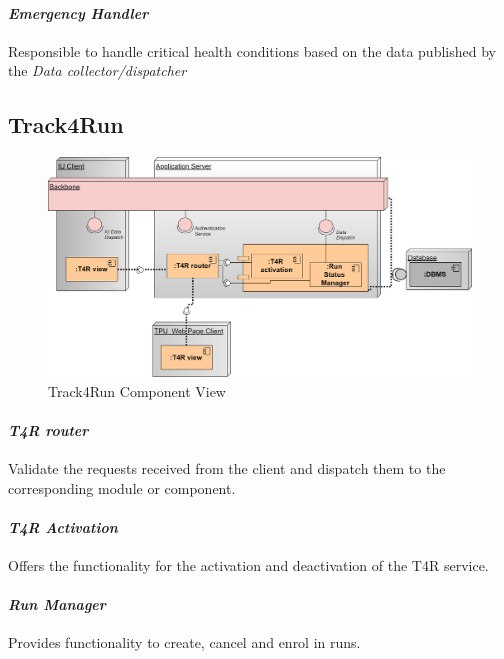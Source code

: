 \paragraph{\textit{Emergency Handler}} Responsible to handle critical health conditions based on the data published by the \textit{Data collector/dispatcher}
\subsection{Track4Run}
\label{subsect:T4RComponentView}
\begin{figure}[H]
\caption{Track4Run Component View}
\centering
\includegraphics[width = \textwidth]{sections/architecturalDesign/T4RDiagram.png}
\end{figure}
\paragraph{\textit{T4R router}} Validate the requests received from the client and dispatch them to the corresponding module or component.
\paragraph{\textit{T4R Activation}} Offers the functionality for the activation and deactivation of the T4R service.
\paragraph{\textit{Run Manager}} Provides functionality to create, cancel and enrol in runs.
